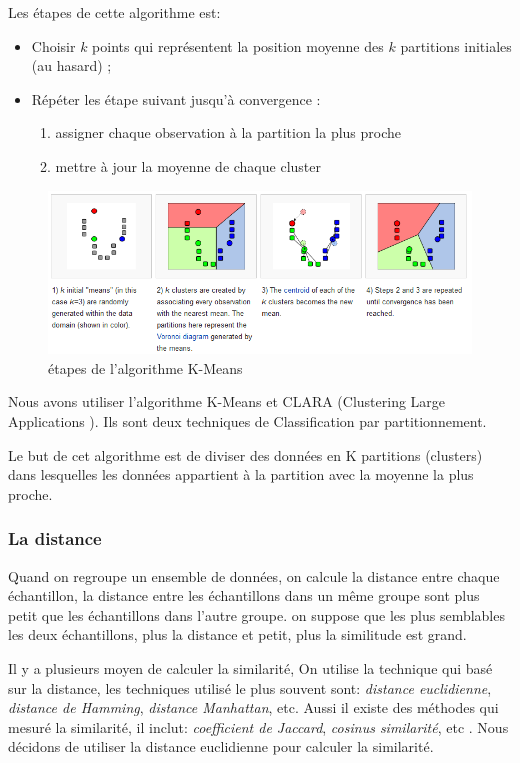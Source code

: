 Les étapes de cette algorithme est:
\begin{itemize}
\item Choisir $k$ points qui représentent la position moyenne des $k$ partitions initiales (au hasard) ;
\item Répéter les étape suivant jusqu'à convergence :
\begin{enumerate}
\item assigner chaque observation à la partition la plus proche
\item mettre à jour la moyenne de chaque cluster
\end{enumerate}
\end{itemize}
\begin{figure}[H]
\centering
\includegraphics[width=0.7\linewidth]{images/kmeans}
\caption{étapes de l'algorithme K-Means}
\label{fig:kmeans}
\end{figure}

Nous avons utiliser l'algorithme K-Means et CLARA (Clustering Large Applications ). Ils sont deux techniques de Classification par partitionnement.

Le but de cet algorithme est de diviser des données en K partitions (clusters) dans lesquelles les données appartient à la partition avec la moyenne la plus proche. 

\subsubsection{La distance}

Quand on regroupe un ensemble de données, on calcule la distance entre chaque échantillon, la distance entre les échantillons dans un même groupe sont plus petit que les échantillons dans l'autre groupe. on suppose que les plus semblables les deux échantillons, plus la distance et petit, plus la similitude est grand.


Il y a plusieurs moyen de calculer la similarité, On utilise la technique qui basé sur la distance, les techniques utilisé le plus souvent sont: \emph{distance euclidienne}, \emph{distance de Hamming}, \emph{distance Manhattan}, etc. Aussi il existe des méthodes qui mesuré la similarité, il inclut: \emph{coefficient de Jaccard}, \emph{cosinus similarité}, etc . Nous décidons de utiliser la distance euclidienne pour calculer la similarité.

